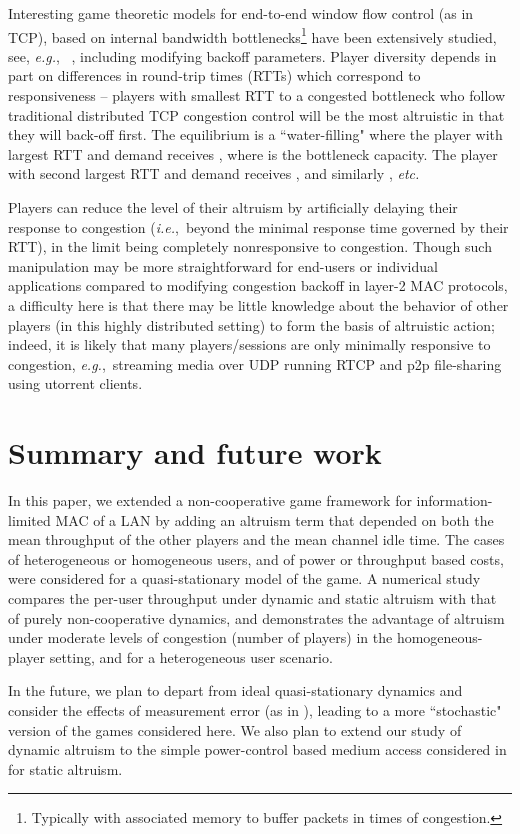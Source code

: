 \documentclass[12pt,onecolumn,draftcls]{IEEEtran}
\newcommand{\etc}{{\em etc.}~}
\newcommand{\ie}{{\em i.e.},~}
\newcommand{\eg}{{\em e.g.},~}
\begin{document}
Interesting game theoretic models for end-to-end window
flow control (as in TCP), based on internal bandwidth
bottlenecks\footnote{Typically with associated memory to buffer packets in
times of congestion.} have been extensively studied, see, \eg
\cite{Mo00,Shenker02}, including modifying backoff parameters.
Player diversity depends in part on differences in round-trip times (RTTs)
which correspond to responsiveness -- players with smallest RTT to a
congested bottleneck who follow traditional distributed TCP congestion
control will be the most altruistic  in that they will back-off first.
The equilibrium is a ``water-filling" where the player with largest RTT and
demand  receives , where  is the bottleneck
capacity. The player with second largest RTT and demand  receives
, and similarly , \etc

Players can reduce the level of their  altruism by artificially delaying
their response to congestion (\ie beyond the minimal response time governed
by their RTT), in the limit being completely nonresponsive to congestion.
Though such manipulation may be more straightforward for end-users or
individual applications compared to modifying congestion backoff in layer-2
MAC protocols, a difficulty here is that there may be little knowledge
about the behavior of other players (in this highly distributed setting) to
form the basis of altruistic action; indeed, it is likely that many
players/sessions are only minimally responsive to congestion, \eg streaming
media over UDP running RTCP and p2p file-sharing using utorrent clients.


\section{Summary and  future work}\label{summary-future-sec}

In this paper, we extended a non-cooperative game framework for
information-limited MAC of a LAN by adding an altruism term that depended
on both the mean throughput of the other players and the mean channel 
idle time. The cases of heterogeneous or homogeneous users, and
of power or throughput based costs, were considered for a quasi-stationary
model of the game. A numerical study compares the per-user throughput
under dynamic and static altruism with that of purely non-cooperative
dynamics, and demonstrates the advantage of altruism under moderate levels
of congestion (number of players) in the homogeneous-player setting, and
for a heterogeneous user scenario.

In the future, we plan to depart from ideal quasi-stationary dynamics and
consider the effects of measurement error (as in \cite{Cui08,Menache07}),
leading to a more ``stochastic" version of the games considered here.  We
also plan to extend our study of dynamic altruism to the simple
power-control based medium access considered in \cite{Kesidis10-cdc} for
static altruism.  
\end{document}
